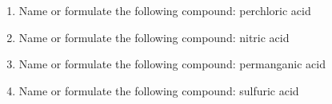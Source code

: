 \documentclass[main.tex]{subfiles}
\begin{document}
\begin{multicols*}{2}
\begin{enumerate}
\item  Name or formulate the following compound: perchloric acid
\begin{enumerate}[label=(\alph*)]
\end{enumerate}

\item  Name or formulate the following compound: nitric acid
\begin{enumerate}[label=(\alph*)]
\end{enumerate}

\item  Name or formulate the following compound: permanganic acid
\begin{enumerate}[label=(\alph*)]
\end{enumerate}

\item  Name or formulate the following compound: sulfuric acid
\begin{enumerate}[label=(\alph*)]
\end{enumerate}



\end{enumerate}
\end{multicols*}
\end{document}
